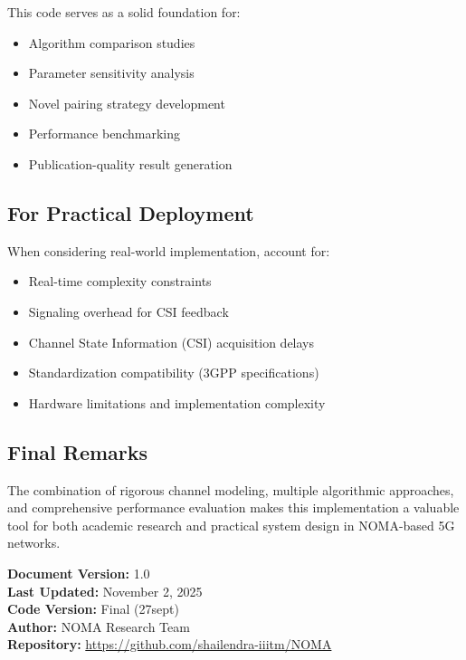 \documentclass[12pt,a4paper]{article}
\begin{document}
This code serves as a solid foundation for:

\begin{itemize}
    \item Algorithm comparison studies
    \item Parameter sensitivity analysis
    \item Novel pairing strategy development
    \item Performance benchmarking
    \item Publication-quality result generation
\end{itemize}

\subsection{For Practical Deployment}

When considering real-world implementation, account for:

\begin{itemize}
    \item Real-time complexity constraints
    \item Signaling overhead for CSI feedback
    \item Channel State Information (CSI) acquisition delays
    \item Standardization compatibility (3GPP specifications)
    \item Hardware limitations and implementation complexity
\end{itemize}

\subsection{Final Remarks}

The combination of rigorous channel modeling, multiple algorithmic approaches, and comprehensive performance evaluation makes this implementation a valuable tool for both academic research and practical system design in NOMA-based 5G networks.

\vspace{1cm}

\noindent
\textbf{Document Version:} 1.0 \\
\textbf{Last Updated:} November 2, 2025 \\
\textbf{Code Version:} Final (27sept) \\
\textbf{Author:} NOMA Research Team \\
\textbf{Repository:} \url{https://github.com/shailendra-iiitm/NOMA}
\end{document}
